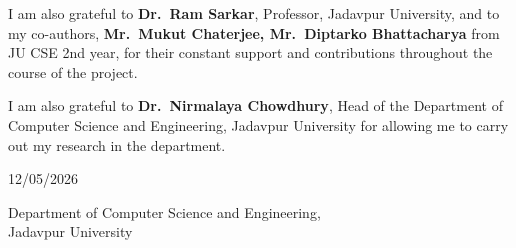 \documentclass[12pt,a4paper]{article}
\begin{document}
\vspace{0.6em}

\noindent
I am also grateful to \textbf{Dr.\ Ram Sarkar}, Professor, Jadavpur
University, and to my co-authors, \textbf{Mr.\ Mukut Chaterjee, Mr.\ Diptarko Bhattacharya} from JU CSE 2nd year, for their constant support and contributions throughout the
course of the project.


\vspace{0.6em}

\noindent
I am also grateful to \textbf{Dr.\ Nirmalaya Chowdhury}, Head of the
Department of Computer Science and Engineering, Jadavpur University for
allowing me to carry out my research in the department.



\vspace{2.5cm}

\noindent
\rule{0pt}{1.2em} 12/05/2026\\
\textbf{}

\vspace{0.4em}

\noindent
Department of Computer Science and Engineering,\\
Jadavpur University
\end{document}
